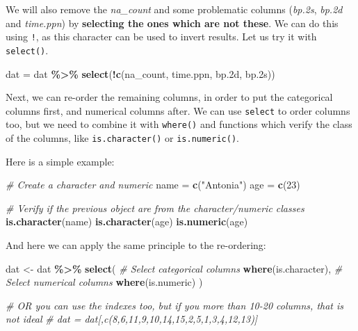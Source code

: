 \documentclass[
]{book}
\newenvironment{Shaded}{\begin{snugshade}}{\end{snugshade}}
\newcommand{\CommentTok}[1]{\textcolor[rgb]{0.56,0.35,0.01}{\textit{#1}}}
\newcommand{\DecValTok}[1]{\textcolor[rgb]{0.00,0.00,0.81}{#1}}
\newcommand{\FloatTok}[1]{\textcolor[rgb]{0.00,0.00,0.81}{#1}}
\newcommand{\FunctionTok}[1]{\textcolor[rgb]{0.13,0.29,0.53}{\textbf{#1}}}
\newcommand{\NormalTok}[1]{#1}
\newcommand{\OtherTok}[1]{\textcolor[rgb]{0.56,0.35,0.01}{#1}}
\newcommand{\SpecialCharTok}[1]{\textcolor[rgb]{0.81,0.36,0.00}{\textbf{#1}}}
\newcommand{\StringTok}[1]{\textcolor[rgb]{0.31,0.60,0.02}{#1}}
\begin{document}
We will also remove the \emph{na\_count} and some problematic columns (\emph{bp.2s}, \emph{bp.2d} and \emph{time.ppn}) by \textbf{selecting the ones which are not these}. We can do this using \texttt{!}, as this character can be used to invert results. Let us try it with \texttt{select()}.

\begin{Shaded}
\begin{Highlighting}[]
\NormalTok{dat }\OtherTok{=}\NormalTok{ dat }\SpecialCharTok{\%\textgreater{}\%}
  \FunctionTok{select}\NormalTok{(}\SpecialCharTok{!}\FunctionTok{c}\NormalTok{(na\_count, time.ppn, bp}\FloatTok{.2}\NormalTok{d, bp}\FloatTok{.2}\NormalTok{s))}
\end{Highlighting}
\end{Shaded}

Next, we can re-order the remaining columns, in order to put the categorical columns first, and numerical columns after. We can use \texttt{select} to order columns too, but we need to combine it with \texttt{where()} and functions which verify the class of the columns, like \texttt{is.character()} or \texttt{is.numeric()}.

Here is a simple example:

\begin{Shaded}
\begin{Highlighting}[]
\CommentTok{\# Create a character and numeric }
\NormalTok{name }\OtherTok{=} \FunctionTok{c}\NormalTok{(}\StringTok{"Antonia"}\NormalTok{)}
\NormalTok{age }\OtherTok{=} \FunctionTok{c}\NormalTok{(}\DecValTok{23}\NormalTok{)}

\CommentTok{\# Verify if the previous object are from the character/numeric classes}
\FunctionTok{is.character}\NormalTok{(name)}
\FunctionTok{is.character}\NormalTok{(age)}
\FunctionTok{is.numeric}\NormalTok{(age)}
\end{Highlighting}
\end{Shaded}

And here we can apply the same principle to the re-ordering:

\begin{Shaded}
\begin{Highlighting}[]
\NormalTok{dat }\OtherTok{\textless{}{-}}\NormalTok{ dat }\SpecialCharTok{\%\textgreater{}\%}
  \FunctionTok{select}\NormalTok{(}
    \CommentTok{\# Select categorical columns}
    \FunctionTok{where}\NormalTok{(is.character), }
    \CommentTok{\# Select numerical columns}
    \FunctionTok{where}\NormalTok{(is.numeric)}
\NormalTok{  )}

\CommentTok{\# OR you can use the indexes too, but if you more than 10{-}20 columns, that is not ideal}
\CommentTok{\# dat = dat[,c(8,6,11,9,10,14,15,2,5,1,3,4,12,13)]}
\end{Highlighting}
\end{Shaded}
\end{document}
